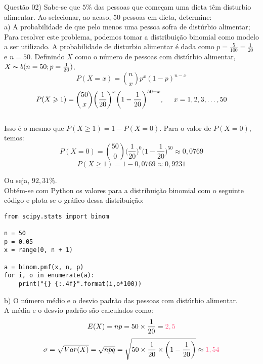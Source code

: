 
\noindent \textcolor{COLOR1}{Questão 02)} Sabe-se que $5\%$ das pessoas que começam uma dieta têm disturbio alimentar. Ao selecionar, ao acaso,
$50$ pessoas em dieta, determine:
\\

a) A probabilidade de que pelo menos uma pessoa sofra de distúrbio alimentar;
\\

Para resolver este problema, podemos tomar a distribuição binomial como modelo a ser utilizado. A probabilidade de disturbio alimentar é dada como $p=\frac{5}{100}=\frac{1}{20}$ e $n=50$. Definindo $X$ como o número de pessoas com distúrbio alimentar, $X \thicksim  b(n=50;p=\frac{1}{20})$.
\\

\[
    P(X=x)=\binom{n}{x}p^x(1-p)^{n-x}
\]
\[
    P(X\geqslant 1)=\binom{50}{x}\biggl(\frac{1}{20}\biggr)^x\biggl(1-\frac{1}{20}\biggr)^{50-x}, \hspace{0.5cm} x=1,2,3,\dots ,50
\]
\\

Isso é o mesmo que $P(X\geqslant 1)=1-P(X=0)$. Para o valor de $P(X=0)$, temos:\\

\[
    P(X=0)=\binom{50}{0}\biggl(\frac{1}{20}\biggr)^0\biggl(1-\frac{1}{20}\biggr)^{50}\approx 0,0769
\]
\[
    P(X\geqslant 1)=1-0,0769 \approx 0,9231
\]

Ou seja, \textcolor{COLOR2}{$92,31\%$}.
\\

Obtém-se com Python os valores para a distribuição binomial com o seguinte código e plota-se o gráfico dessa distribuição:\\

\begin{lstlisting}
from scipy.stats import binom

n = 50
p = 0.05
x = range(0, n + 1)
    
a = binom.pmf(x, n, p)
for i, o in enumerate(a):
    print("{} {:.4f}".format(i,o*100))
\end{lstlisting}




b) O número médio e o desvio padrão das pessoas com distúrbio alimentar.\\

A média e o desvio padrão são calculados como:\\

\[
    E(X) = np = 50\times\frac{1}{20} = \textcolor{COLOR2}{2,5}
\]
\[
    \sigma = \sqrt{Var(X)} = \sqrt{npq} = \sqrt{50 \times \frac{1}{20} \times \biggl(1-\frac{1}{20}\biggr)} \approx \textcolor{COLOR2}{1,54}
\]
